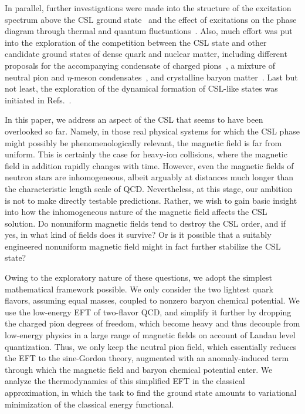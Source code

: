 \documentclass[pdflatex,iicol,sn-mathphys-num]{sn-jnl}
\begin{document}
In parallel, further investigations were made into the structure of the excitation spectrum above the CSL ground state~\cite{Yamamoto:2015maz,Ozaki:2016vwu,Brauner:2017mui} and the effect of excitations on the phase diagram through thermal and quantum fluctuations~\cite{Brauner:2021sci,Brauner:2023ort}. Also, much effort was put into the exploration of the competition between the CSL state and other candidate ground states of dense quark and nuclear matter, including different proposals for the accompanying condensate of charged pions~\cite{Evans:2022hwr,Eto:2025fkt,Eto:2023wul,Evans:2023hms}, a mixture of neutral pion and $\eta$-meson condensates~\cite{Qiu:2023guy}, and crystalline baryon matter~\cite{Chen:2021vou,Qiu:2024zpg,Amari:2025twm}. Last but not least, the exploration of the dynamical formation of CSL-like states was initiated in Refs.~\cite{Eto:2022lhu,Higaki:2022gnw,Nishimura:2023czx,Eto:2025ebz}.

In this paper, we address an aspect of the CSL that seems to have been overlooked so far. Namely, in those real physical systems for which the CSL phase might possibly be phenomenologically relevant, the magnetic field is far from uniform. This is certainly the case for heavy-ion collisions, where the magnetic field in addition rapidly changes with time. However, even the magnetic fields of neutron stars are inhomogeneous, albeit arguably at distances much longer than the characteristic length scale of QCD. Nevertheless, at this stage, our ambition is not to make directly testable predictions. Rather, we wish to gain basic insight into how the inhomogeneous nature of the magnetic field affects the CSL solution. Do nonuniform magnetic fields tend to destroy the CSL order, and if yes, in what kind of fields does it survive? Or is it possible that a suitably engineered nonuniform magnetic field might in fact further stabilize the CSL state?

Owing to the exploratory nature of these questions, we adopt the simplest mathematical framework possible. We only consider the two lightest quark flavors, assuming equal masses, coupled to nonzero baryon chemical potential. We use the low-energy EFT of two-flavor QCD, and simplify it further by dropping the charged pion degrees of freedom, which become heavy and thus decouple from low-energy physics in a large range of magnetic fields on account of Landau level quantization. Thus, we only keep the neutral pion field, which essentially reduces the EFT to the sine-Gordon theory, augmented with an anomaly-induced term through which the magnetic field and baryon chemical potential enter. We analyze the thermodynamics of this simplified EFT in the classical approximation, in which the task to find the ground state amounts to variational minimization of the classical energy functional.
\end{document}
